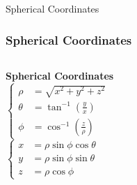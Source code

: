 \documentclass[aspectratio=169, UTF8]{beamer}
\begin{document}
\begin{frame}{Spherical Coordinates}
    \frametitle{Spherical Coordinates}
\begin{columns}
    \begin{column}{0.3\textwidth}
        \textbf{Spherical Coordinates} \\
$
\begin{cases}
    \rho &= \sqrt{x^2 + y^2 + z^2} \\
    \theta &= \tan^{-1}\left(\frac{y}{x}\right) \\
    \phi &= \cos^{-1}\left(\frac{z}{\rho}\right)
\end{cases}
$
\\
$
\begin{cases}
    x &= \rho\sin\phi\cos\theta \\
    y &= \rho\sin\phi\sin\theta \\
    z &= \rho\cos\phi
\end{cases}
$
    \end{column}
    

\end{columns}
\end{frame}
\end{document}
